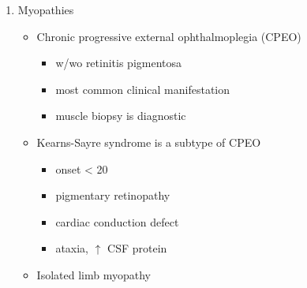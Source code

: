 \documentclass{scrartcl}
\begin{document}
\begin{enumerate}
\item Myopathies
\label{sec:orge857c2e}
\begin{itemize}
\item Chronic progressive external ophthalmoplegia (CPEO)
\begin{itemize}
\item w/wo retinitis pigmentosa
\item most common clinical manifestation
\item muscle biopsy is diagnostic
\end{itemize}
\item Kearns-Sayre syndrome is a subtype of CPEO
\begin{itemize}
\item onset \textless{} 20
\item pigmentary retinopathy
\item cardiac conduction defect
\item ataxia, \(\uparrow\) CSF protein
\end{itemize}
\item Isolated limb myopathy
\end{itemize}


\end{enumerate}
\end{document}
